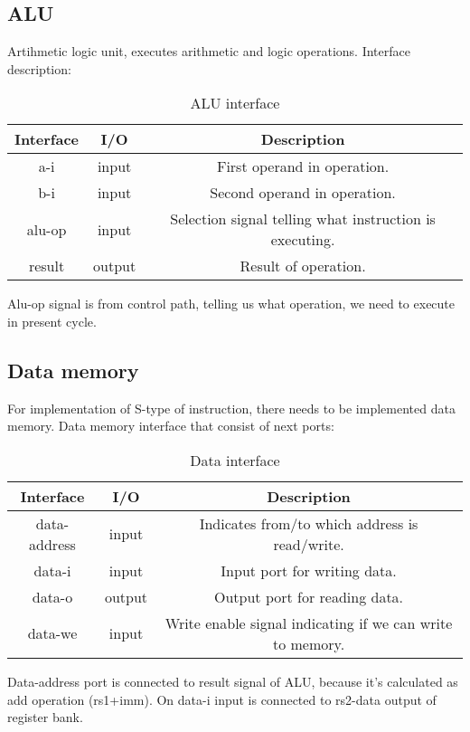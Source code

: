 \documentclass{scrreprt}
\begin{document}
\subsection*{ALU}
Artihmetic logic unit, executes arithmetic and logic operations. Interface description:
\begin{table}[ht]
        \centering
        \begin{tabular}{|c|c|c|} \hline 
             Interface & I/O & Description \\ \hline  
             a-i & input & First operand in operation. \\ \hline  
             b-i & input & Second operand in operation.  \\ \hline
             alu-op & input & Selection signal telling what instruction is executing. \\ \hline
             result & output & Result of operation. \\ \hline
        \end{tabular}
        \caption{ALU interface}
        \label{tab:ALU interface}
    \end{table}
    \hfill \break
Alu-op signal is from control path, telling us what operation, we need to execute in present cycle. 
\subsection*{Data memory}
For implementation of S-type of instruction, there needs to be implemented data memory. 
Data memory interface that consist of next ports:
\begin{table}[ht]
        \centering
        \begin{tabular}{|c|c|c|} \hline 
             Interface & I/O & Description \\ \hline  
             data-address & input & Indicates from/to which address is read/write.  \\ \hline  
             data-i & input & Input port for writing data.  \\ \hline
             data-o & output & Output port for reading data. \\ \hline
             data-we & input & Write enable signal indicating if we can write to memory. \\ \hline
        \end{tabular}
        \caption{Data interface}
        \label{tab:Data interface}
    \end{table}
    \hfill \break
Data-address port is connected to result signal of ALU, because it's calculated as add operation (rs1+imm). On data-i input is connected to rs2-data output of register bank. 
\end{document}
